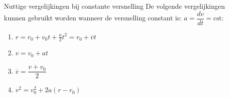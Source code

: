 






\begin{pro}{Nuttige vergelijkingen bij constante versnelling}
    \vspace{-0.3cm}
    De volgende vergelijkingen kunnen gebruikt worden wanneer de versnelling constant is: $a = \dfrac{dv}{dt} = \text{cst}$:
    \begin{enumerate}
        \item $ r = r_{0} + v_{0}t + \tfrac{a}{2}t^2 = r_{0} + \overline{v}t$
        \item $ v = v_0 + at $ 
        \item $ \overline{v} = \dfrac{v + v_0}{2}$
        \item $ v^2 = v_0^2 + 2a(r-r_0) $
    \end{enumerate}
    \vspace{-0.3cm}
\end{pro}

